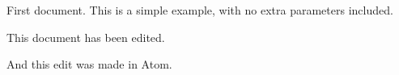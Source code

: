 \documentclass{article}
\begin{document}
First document. This is a simple example, with no
extra parameters included.

This document has been edited.

And this edit was made in Atom.
\end{document}
